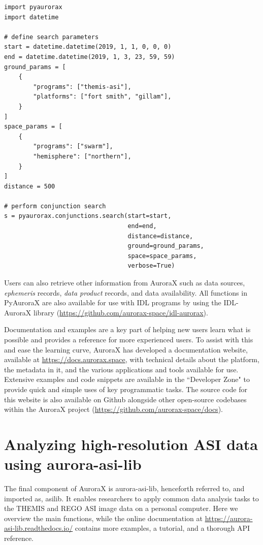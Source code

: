 \documentclass[utf8]{FrontiersinHarvard} %
\begin{document}
\begin{verbatim}
import pyaurorax
import datetime

# define search parameters
start = datetime.datetime(2019, 1, 1, 0, 0, 0)
end = datetime.datetime(2019, 1, 3, 23, 59, 59)
ground_params = [
    {
        "programs": ["themis-asi"],
        "platforms": ["fort smith", "gillam"],
    }
]
space_params = [
    {
        "programs": ["swarm"],
        "hemisphere": ["northern"],
    }
]
distance = 500

# perform conjunction search
s = pyaurorax.conjunctions.search(start=start,
                                  end=end,
                                  distance=distance,
                                  ground=ground_params,
                                  space=space_params,
                                  verbose=True)
\end{verbatim}

Users can also retrieve other information from AuroraX such as data sources, \textit{ephemeris} records, \textit{data product} records, and data availability. All functions in PyAuroraX are also available for use with IDL programs by using the IDL-AuroraX library (\url{https://github.com/aurorax-space/idl-aurorax}). 

Documentation and examples are a key part of helping new users learn what is possible and provides a reference for more experienced users. To assist with this and ease the learning curve, AuroraX has developed a documentation website, available at \url{https://docs.aurorax.space}, with technical details about the platform, the metadata in it, and the various applications and tools available for use. Extensive examples and code snippets are available in the ``Developer Zone" to provide quick and simple uses of key programmatic tasks. The source code for this website is also available on Github alongside other open-source codebases within the AuroraX project (\url{https://github.com/aurorax-space/docs}). 

\section{Analyzing high-resolution ASI data using aurora-asi-lib}\label{aurora-asi-lib}
The final component of AuroraX is aurora-asi-lib, henceforth referred to, and imported as, asilib. It enables researchers to apply common data analysis tasks to the THEMIS and REGO ASI image data on a personal computer. Here we overview the main functions, while the online documentation at \url{https://aurora-asi-lib.readthedocs.io/} contains more examples, a tutorial, and a thorough API reference.
\end{document}
